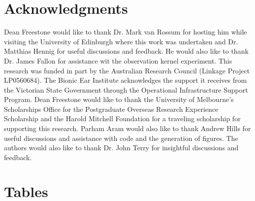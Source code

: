 \documentclass[review,authoryear,3p]{elsarticle}
\begin{document}
\section{Acknowledgments}
Dean Freestone would like to thank Dr. Mark van Rossum for hosting him while visiting the University of Edinburgh where this work was undertaken and Dr. Matthias Hennig for useful discussions and feedback. He would also like to thank Dr. James Fallon for assistance wit the observation kernel experiment. This research was funded in part by the Australian Research Council (Linkage Project LP0560684). The Bionic Ear Institute acknowledges the support it receives from the Victorian State Government through the Operational Infrastructure Support Program. Dean Freestone would like to thank the University of Melbourne's Scholarships Office for the Postgraduate Overseas Research Experience Scholarship and the Harold Mitchell Foundation for a traveling scholarship for supporting this research. Parham Aram would also like to thank Andrew Hills for useful discussions and assistance with code and the generation of figures. The authors would also like to thank Dr. John Terry for insightful discussions and feedback.

 


\clearpage
\newpage
\section*{Tables}

\singlespacing
\end{document}
